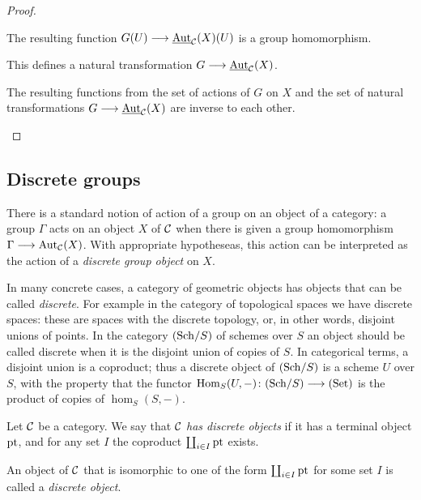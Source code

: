 \begin{2   CONTRAVARIANT FUNCTORS}
\begin{2.2 Group objects}
\begin{proof}
\begin{enumeratei}
\item The resulting function $G(U) \arr \underaut_{\cC}(X)(U)$ is a group homomorphism.

\item This defines a natural transformation $G \arr \underaut_{\cC}(X)$.

\item The resulting functions from the set of actions of $G$ on $X$ and the set of natural transformations $G \arr \underaut_{\cC}(X)$ are inverse to each other.\qedhere

\end{enumeratei}
\end{proof}



\subsection{Discrete groups}\label{subsec:discrete-groups}

There is a standard notion of action of a group on an object of a category: a group $\Gamma$ acts on an object $X$ of $\mathcal{C}$ when there is given a group homomorphism $\Gamma \arr \aut_{\cC}(X)$. With appropriate hypotheseas, this action can be interpreted as the action of a \emph{discrete group object} on $X$.

In many concrete cases, a category of geometric objects has objects that can be called \emph{discrete}. For example in the category of topological spaces we have discrete spaces: these are spaces with the discrete topology, or, in other words, disjoint unions of points. In the category $({\mathrm{Sch}/S})$ of schemes over $S$ an object should be called discrete when it is the disjoint union of copies of $S$. In categorical terms, a disjoint union is a coproduct; thus a discrete object of $({\mathrm{Sch}/S})$ is a scheme $U$ over $S$, with the property that the functor $\hom_S(U, -) \colon \catsch{S} \arr \catset$ is the product of copies of $\hom_S(S, -)$.

\begin{definition}
Let $\mathcal{C}$ be a category. We say that $\mathcal{C}$ \emph{has discrete objects} if it has a terminal object $\mathrm{pt}$, and for any set $I$ the coproduct $\coprod_{i \in I} \mathrm{pt}$ exists.

An object of $\mathcal{C}$ that is isomorphic to one of the form $\coprod_{i \in I} \mathrm{pt}$ for some set $I$ is called a \emph{discrete object}.
\end{definition}


\end{2.2 Group objects}
\end{2   CONTRAVARIANT FUNCTORS}
